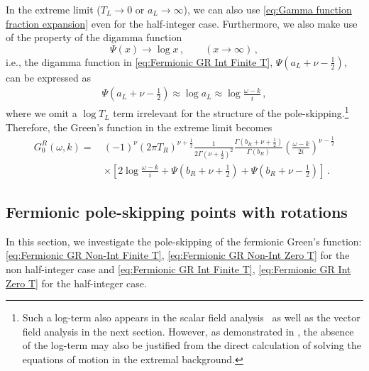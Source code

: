 \documentclass[11pt,a4paper]{article}
\newcommand{\ra}{\rightarrow}
\begin{document}
In the extreme limit ($T_L \ra 0$ or $a_L \rightarrow \infty$), we can also use \eqref{eq:Gamma function fraction expansion} even for the half-integer case.
Furthermore, we also make use of the property of the digamma function 
\begin{equation}\label{ASYMDIGA}
    \Psi(x) \ra \log{x}\,, \qquad (x \ra \infty) \,,
\end{equation}
i.e., the digamma function in \eqref{eq:Fermionic GR Int Finite T}, $\Psi\left({a}_L+\nu-\frac{1}{2}\right)$, can be expressed as
\begin{equation}\label{eq:Digamma function expansion}
\begin{aligned}
    \Psi\left({a}_L+\nu-\frac{1}{2}\right)
     \approx \log {a}_L
     \approx \log\frac{\omega-k}{i} \,, 
\end{aligned}
\end{equation}
where we omit a $\log T_L$ term irrelevant for the structure of the pole-skipping.\footnote{Such a log-term also appears in the scalar field analysis~\cite{Natsuume:2020snz} as well as the vector field analysis in the next section. However, as demonstrated in \cite{Natsuume:2020snz}, the absence of the log-term may also be justified from the direct calculation of solving the equations of motion in the extremal background.}
Therefore, the Green's function in the extreme limit becomes
\begin{equation} \label{eq:Fermionic GR Int Zero T}
\begin{split}
    G^R_{0} (\omega, k) =\, & (-1)^\nu (2\pi T_R)^{\nu+\frac{1}{2}} \frac{1}{2\Gamma(\nu+\frac{1}{2})^2} \frac{\Gamma({b}_R+\nu+\frac{1}{2})}{\Gamma({b}_R)} \left( \frac{\omega-k}{2 i} \right)^{\nu-\frac{1}{2}} \\
     & \times \left[ 2 \log\frac{\omega-k}{i} +\Psi\left({b}_R+\nu+\frac{1}{2}\right) +\Psi\left({b}_R+\nu-\frac{1}{2}\right) \right]\,.
\end{split}
\end{equation}








%    
\subsection{Fermionic pole-skipping points with rotations}

In this section, we investigate the pole-skipping of the fermionic Green's function: \eqref{eq:Fermionic GR Non-Int Finite T}, \eqref{eq:Fermionic GR Non-Int Zero T} for the non half-integer case and \eqref{eq:Fermionic GR Int Finite T}, \eqref{eq:Fermionic GR Int Zero T} for the half-integer case.
\end{document}
